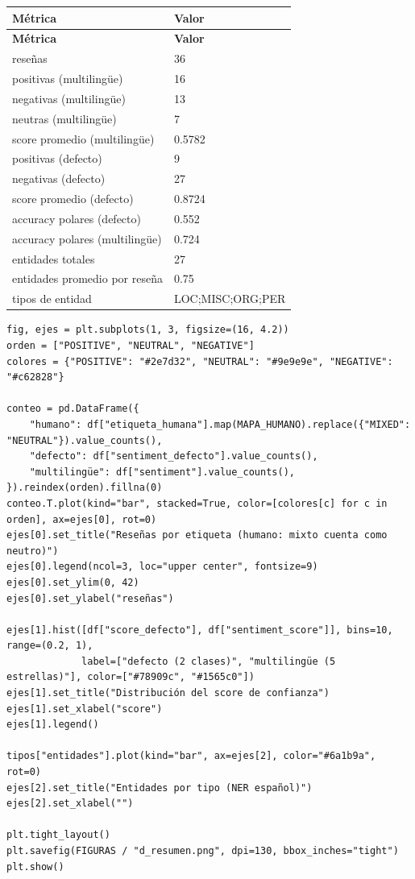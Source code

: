 \documentclass[12pt,a4paper]{article}
\begin{document}
{\small\renewcommand{\arraystretch}{1.3}
\begin{longtable}{|l|l|}
\hline
\textbf{Métrica} & \textbf{Valor} \\ \hline
\endfirsthead
\hline
\textbf{Métrica} & \textbf{Valor} \\ \hline
\endhead
reseñas & 36 \\ \hline
positivas (multilingüe) & 16 \\ \hline
negativas (multilingüe) & 13 \\ \hline
neutras (multilingüe) & 7 \\ \hline
score promedio (multilingüe) & 0.5782 \\ \hline
positivas (defecto) & 9 \\ \hline
negativas (defecto) & 27 \\ \hline
score promedio (defecto) & 0.8724 \\ \hline
accuracy polares (defecto) & 0.552 \\ \hline
accuracy polares (multilingüe) & 0.724 \\ \hline
entidades totales & 27 \\ \hline
entidades promedio por reseña & 0.75 \\ \hline
tipos de entidad & LOC;MISC;ORG;PER \\ \hline
\end{longtable}}

\begin{lstlisting}[style=codigo]
fig, ejes = plt.subplots(1, 3, figsize=(16, 4.2))
orden = ["POSITIVE", "NEUTRAL", "NEGATIVE"]
colores = {"POSITIVE": "#2e7d32", "NEUTRAL": "#9e9e9e", "NEGATIVE": "#c62828"}

conteo = pd.DataFrame({
    "humano": df["etiqueta_humana"].map(MAPA_HUMANO).replace({"MIXED": "NEUTRAL"}).value_counts(),
    "defecto": df["sentiment_defecto"].value_counts(),
    "multilingüe": df["sentiment"].value_counts(),
}).reindex(orden).fillna(0)
conteo.T.plot(kind="bar", stacked=True, color=[colores[c] for c in orden], ax=ejes[0], rot=0)
ejes[0].set_title("Reseñas por etiqueta (humano: mixto cuenta como neutro)")
ejes[0].legend(ncol=3, loc="upper center", fontsize=9)
ejes[0].set_ylim(0, 42)
ejes[0].set_ylabel("reseñas")

ejes[1].hist([df["score_defecto"], df["sentiment_score"]], bins=10, range=(0.2, 1),
             label=["defecto (2 clases)", "multilingüe (5 estrellas)"], color=["#78909c", "#1565c0"])
ejes[1].set_title("Distribución del score de confianza")
ejes[1].set_xlabel("score")
ejes[1].legend()

tipos["entidades"].plot(kind="bar", ax=ejes[2], color="#6a1b9a", rot=0)
ejes[2].set_title("Entidades por tipo (NER español)")
ejes[2].set_xlabel("")

plt.tight_layout()
plt.savefig(FIGURAS / "d_resumen.png", dpi=130, bbox_inches="tight")
plt.show()
\end{lstlisting}
\end{document}
